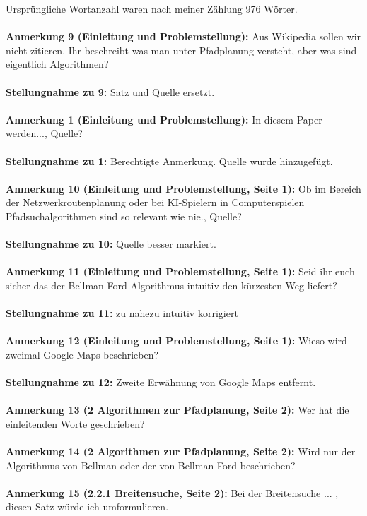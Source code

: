 \documentclass[a4paper,12pt]{book}
\begin{document}
Ursprüngliche Wortanzahl waren nach meiner Zählung 976 Wörter.
\\ \\
\textbf{Anmerkung 9 (Einleitung und Problemstellung):}
Aus Wikipedia sollen wir nicht zitieren. Ihr beschreibt was man unter Pfadplanung versteht, aber was sind eigentlich Algorithmen?
\\ \\
\textbf{Stellungnahme zu 9:}
Satz und Quelle ersetzt.
\\ \\
\textbf{Anmerkung 1 (Einleitung und Problemstellung):}
\glqq In diesem Paper werden...\grqq, Quelle?
\\ \\
\textbf{Stellungnahme zu 1:}
Berechtigte Anmerkung. Quelle wurde hinzugefügt.
\\ \\
\textbf{Anmerkung 10 (Einleitung und Problemstellung, Seite 1):}
\glqq Ob im Bereich der Netzwerkroutenplanung oder bei KI-Spielern in Computerspielen Pfadsuchalgorithmen sind so relevant wie nie.\grqq, Quelle? 
\\ \\
\textbf{Stellungnahme zu 10:}
Quelle besser markiert.
\\ \\
\textbf{Anmerkung 11 (Einleitung und Problemstellung, Seite 1):}
Seid ihr euch sicher das der Bellman-Ford-Algorithmus \glqq intuitiv\grqq{} den kürzesten Weg liefert?
\\ \\
\textbf{Stellungnahme zu 11:}
zu \glqq nahezu intuitiv \grqq korrigiert
\\ \\
\textbf{Anmerkung 12 (Einleitung und Problemstellung, Seite 1):}
Wieso wird zweimal Google Maps beschrieben? 
\\ \\
\textbf{Stellungnahme zu 12:}
Zweite Erwähnung von Google Maps entfernt.
\\ \\
\textbf{Anmerkung 13 (2 Algorithmen zur Pfadplanung, Seite 2):}
Wer hat die einleitenden Worte geschrieben?
\\ \\
\textbf{Anmerkung 14 (2 Algorithmen zur Pfadplanung, Seite 2):}
Wird nur der Algorithmus von Bellman oder der von Bellman-Ford beschrieben?
\\ \\
\textbf{Anmerkung 15 (2.2.1 Breitensuche, Seite 2):}
\grqq Bei der Breitensuche ... \glqq, diesen Satz würde ich umformulieren.
\end{document}
